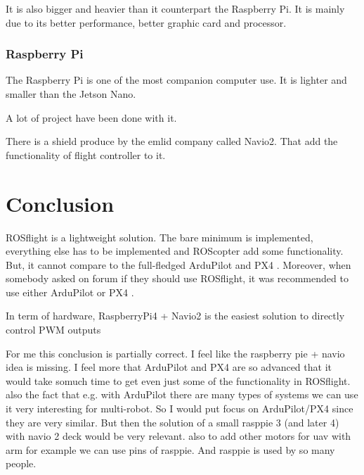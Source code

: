 It is also bigger and heavier than it counterpart the Raspberry Pi. It is mainly due to its better performance, better graphic card and processor.

\subsubsection{Raspberry Pi}
The Raspberry Pi is one of the most companion computer use. It is lighter and smaller than the Jetson Nano.

A lot of project have been done with it.

There is a shield produce by the emlid company called Navio2. That add the functionality of flight controller to it.

\section{Conclusion}
ROSflight is a lightweight solution. The bare minimum is implemented, everything else has to be implemented and ROScopter add some functionality. But, it cannot compare to the full-fledged ArduPilot and PX4 \cite{reddit_firmware_ros}. Moreover, when somebody asked on forum if they should use ROSflight, it was recommended to use either ArduPilot or PX4 \cite{reddit_swarm_ros}.

In term of hardware, RaspberryPi4 + Navio2 is the easiest solution to directly control PWM outputs

    {\color{red}For me this conclusion is partially correct. I feel like the raspberry pie + navio idea is missing. }
    {\color{red}I feel more that ArduPilot and PX4 are so advanced that it would take somuch time to get even just some of the functionality in ROSflight. also the fact that e.g. with ArduPilot there are many types of systems we can use it very interesting for multi-robot. So I would put focus on ArduPilot/PX4 since they are very similar. But then the solution of a small rasppie 3 (and later 4) with navio 2 deck would be very relevant. also to add other motors for uav with arm for example we can use pins of rasppie. And rasppie is used by so many people.}
